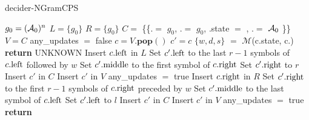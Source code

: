 \begin{algorithm}
    \caption{{\sc decider-NGramCPS}}\label{alg:NGramCPS}

    \begin{algorithmic}[1]

        \State $g_0 = (\mathcal{A}_0)^n$ 
        \State $L = \{ g_0 \}$ 
        \State $R = \{ g_0 \}$ 
        \State $C =$ \{\{.\leftngram $=$ $g_0$, .\rightngram $=$ $g_0$, .state $=$ \stateA, .\middlesymbol $=$ $\mathcal{A}_0$ \}\} 
        \label{alg:NGramCPS:line:whileTrue}
        \State $V = C$
        \State any\_updates $=$ false
        \State $c = V.\textbf{pop}()$
        \State $c' = c$
        \State $\{w,d,s\}$ $=$ $\mathcal{M}$(c.state, c.\middlesymbol) 
        \State {} 
        \State \textbf{return} UNKNOWN\label{alg:NGramCPS:line:unknown}
        \EndIf
        \State {}
        \State Insert $c.\text{left}$ in $L$ \label{alg:NGramCPS:line:insertL}
        \State Set $c'.\text{left}$ to the last $r-1$ symbols of $c.\text{left}$ followed by $w$
        \State Set $c'.\text{middle}$ to the first symbol of $c.\text{right}$
        \State Set $c'.\text{right}$ to $r$
        \State \tabi Insert $c'$ in $C$ \label{alg:NGramCPS:line:insertInConfSet}
        \State \tabi Insert $c'$ in $V$ \label{alg:NGramCPS:line:insertInConfSetToVisit}
        \State \tabi any\_updates $=$ true
        \EndIf
        \EndFor
        \EndIf
        \State {} \label{alg:NGramCPS:line:moveLeft}
        \State Insert $c.\text{right}$ in $R$
        \State Set $c'.\text{right}$ to the first $r-1$ symbols of $c.\text{right}$ preceded by $w$
        \State Set $c'.\text{middle}$ to the last symbol of $c.\text{left}$
        \State Set $c'.\text{left}$ to $l$
        \State \tabi Insert $c'$ in $C$
        \State \tabi Insert $c'$ in $V$
        \State \tabi any\_updates $=$ true
        \EndIf
        \EndFor
        \EndIf
        \EndWhile
        \State {}
        \State \textbf{return} \NONHALT\label{alg:NGramCPS:line:nonhalt} 
        \EndIf

        \EndWhile
    \end{algorithmic}
\end{algorithm}
